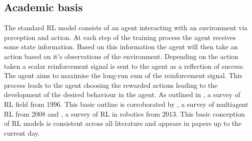 \documentclass[10pt,journal]{IEEEtran}
\begin{document}
\subsection{Academic basis}
The standard RL model consists of an agent interacting with an environment via perception and action. At each step of the training process the agent receives some state information. Based on this information the agent will then take an action based on it's observations of the environment. Depending on the action taken a scalar reinforcement signal is sent to the agent as a reflection of success. The agent aims to maximise the long-run sum of the reinforcement signal. This process leads to the agent choosing the rewarded actions leading to the development of the desired behaviour in the agent. As outlined in \cite{Kaelbling}, a survey of RL field from 1996. This basic outline is corroborated by \cite{Busoniu}, a survey of multiagent RL from 2008 and \cite{Kober}, a survey of RL in robotics from 2013. This basic conception of RL models is consistent across all literature and appears in papers up to the current day.
\end{document}
